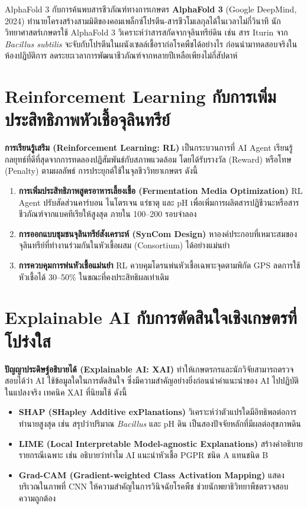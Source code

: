 \begin{definitionbox}{AlphaFold 3 กับการค้นพบสารชีวภัณฑ์ทางการเกษตร}
\textbf{AlphaFold 3} (Google DeepMind, 2024) ทำนายโครงสร้างสามมิติของคอมเพล็กซ์โปรตีน-สารชีวโมเลกุลได้ในเวลาไม่กี่วินาที นักวิทยาศาสตร์เกษตรใช้ AlphaFold 3 วิเคราะห์ว่าสารสกัดจากจุลินทรีย์ดิน เช่น สาร Iturin จาก \textit{Bacillus subtilis} จะจับกับโปรตีนในผนังเซลล์เชื้อราก่อโรคพืชได้อย่างไร ก่อนนำมาทดสอบจริงในห้องปฏิบัติการ ลดระยะเวลาการพัฒนาชีวภัณฑ์จากหลายปีเหลือเพียงไม่กี่สัปดาห์
\end{definitionbox}

\section{Reinforcement Learning กับการเพิ่มประสิทธิภาพหัวเชื้อจุลินทรีย์}

\textbf{การเรียนรู้เสริม (Reinforcement Learning: RL)} เป็นกระบวนการที่ AI Agent เรียนรู้กลยุทธ์ที่ดีที่สุดจากการทดลองปฏิสัมพันธ์กับสภาพแวดล้อม โดยได้รับรางวัล (Reward) หรือโทษ (Penalty) ตามผลลัพธ์ การประยุกต์ใช้ในจุลชีววิทยาเกษตร ดังนี้
\begin{enumerate}
    \item \textbf{การเพิ่มประสิทธิภาพสูตรอาหารเลี้ยงเชื้อ (Fermentation Media Optimization)} RL Agent ปรับสัดส่วนคาร์บอน ไนโตรเจน แร่ธาตุ และ pH เพื่อเพิ่มการผลิตสารปฏิชีวนะหรือสารชีวภัณฑ์จากแบคทีเรียให้สูงสุด ภายใน 100--200 รอบจำลอง
    \item \textbf{การออกแบบชุมชนจุลินทรีย์สังเคราะห์ (SynCom Design)} หาองค์ประกอบที่เหมาะสมของจุลินทรีย์ที่ทำงานร่วมกันในหัวเชื้อผสม (Consortium) ได้อย่างแม่นยำ
    \item \textbf{การควบคุมการพ่นหัวเชื้อแม่นยำ} RL ควบคุมโดรนพ่นหัวเชื้อเฉพาะจุดตามพิกัด GPS ลดการใช้หัวเชื้อได้ 30--50\% ในขณะที่คงประสิทธิผลเท่าเดิม
\end{enumerate}

\section{Explainable AI กับการตัดสินใจเชิงเกษตรที่โปร่งใส}

\textbf{ปัญญาประดิษฐ์อธิบายได้ (Explainable AI: XAI)} ทำให้เกษตรกรและนักวิจัยสามารถตรวจสอบได้ว่า AI ใช้ข้อมูลใดในการตัดสินใจ ซึ่งมีความสำคัญอย่างยิ่งก่อนนำคำแนะนำของ AI ไปปฏิบัติในแปลงจริง เทคนิค XAI ที่นิยมใช้ ดังนี้
\begin{itemize}
    \item \textbf{SHAP (SHapley Additive exPlanations)} วิเคราะห์ว่าตัวแปรใดมีอิทธิพลต่อการทำนายสูงสุด เช่น สรุปว่าปริมาณ \textit{Bacillus} และ pH ดิน เป็นสองปัจจัยหลักที่มีผลต่อสุขภาพดิน
    \item \textbf{LIME (Local Interpretable Model-agnostic Explanations)} สร้างคำอธิบายรายกรณีเฉพาะ เช่น อธิบายว่าทำไม AI แนะนำหัวเชื้อ PGPR ชนิด A แทนชนิด B
    \item \textbf{Grad-CAM (Gradient-weighted Class Activation Mapping)} แสดงบริเวณในภาพที่ CNN ให้ความสำคัญในการวินิจฉัยโรคพืช ช่วยนักพยาธิวิทยาพืชตรวจสอบความถูกต้อง
\end{itemize}

